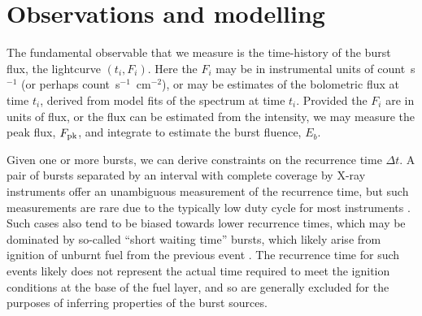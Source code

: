 \documentclass{aastex63}
\newcommand\latex{La\TeX}
\begin{document}

\section{Observations and modelling} 
\label{sec:data}


The fundamental observable that we measure is the time-history of the burst flux, the lightcurve $(t_i,F_{i})$. Here the $F_{i}$ may be in instrumental units of count~s$^{-1}$ (or perhaps count~s$^{-1}$~cm$^{-2}$), or may be estimates of the bolometric flux at time $t_i$, derived from model fits of the spectrum at time $t_i$.
%
Provided the $F_i$ are in units of flux, or the flux can be estimated from the intensity,  we may measure the peak flux, $F_{\rm pk}$, and integrate to estimate the burst fluence, $E_b$. 

Given one or more bursts, we can derive constraints on the recurrence time $\Delta t$. A pair of bursts separated by an interval with complete coverage by X-ray instruments offer an unambiguous measurement of the recurrence time, but such measurements are rare due to the typically low duty cycle for most instruments \cite[e.g.][]{minbar}.
%
Such cases also tend to be biased towards lower recurrence times, which may be dominated by so-called ``short waiting time'' bursts, which likely arise from ignition of unburnt fuel from the previous event \cite[]{keek10}. The recurrence time for such events likely does not represent the actual time required to meet the ignition conditions at the base of the fuel layer, and so are generally excluded for the purposes of inferring properties of the burst sources.
\end{document}
